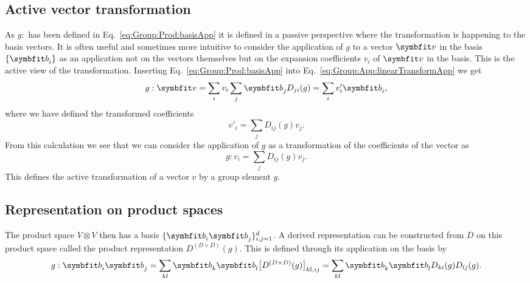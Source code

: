 \subsection{Active vector transformation}

As $g:$ has been defined in Eq.~\eqref{eq:Group:Prod:basisApp} it is defined in a passive perspective where the transformation is happening
to the basis vectors. It is often useful and sometimes more intuitive to consider
the application of $g$ to a vector $\v{v}$ in the basis $\{\v{b}_i\}$ as an application not
on the vectors themselves but on the expansion coefficients $v_i$ of $\v{v}$ in the basis. This is the active view of the transformation.
Inserting Eq.~\eqref{eq:Group:Prod:basisApp} into Eq.~\eqref{eq:Group:App:linearTransformApp} we get
\begin{equation}
    \label{eq:Group:App:activeTransform}
        g:\v{v} = \sum_iv_i\sum_j\v{b}_jD_{ji}(g) = \sum_iv'_i\v{b}_i,
\end{equation}
where we have defined the transformed coefficients
\begin{equation}
    \label{eq:Group:App:transformedCoeff}
    v'_i = \sum_jD_{ij}(g)v_j.
\end{equation}
From this calculation we see that we can consider the application of $g$ as a transformation of the coefficients of the vector as
\begin{equation}
    \label{eq:Group:App:coeffTransformation}
    g:v_i = \sum_jD_{ij}(g)v_j.
\end{equation}
This defines the active transformation of a vector $v$ by a group element $g$.

\subsection{Representation on product spaces}

The product space $V\otimes V$ then has a basis $\{\v{b}_i\v{b}_j\}_{i,j=1}^d$. A derived representation can be constructed from $D$ on this product space
called the product representation $D^{(D\times D)}(g)$. This is defined through its application on the basis by
\begin{equation}
    \label{eq:Group:Prod:prodBasisApp}
    g:\v{b}_i\v{b}_j = \sum_{kl}\v{b}_k\v{b}_l\big[D^{(D\times D)}(g)\big]_{kl,ij} = \sum_{kl}\v{b}_k\v{b}_lD_{ki}(g)D_{lj}(g).
\end{equation}

